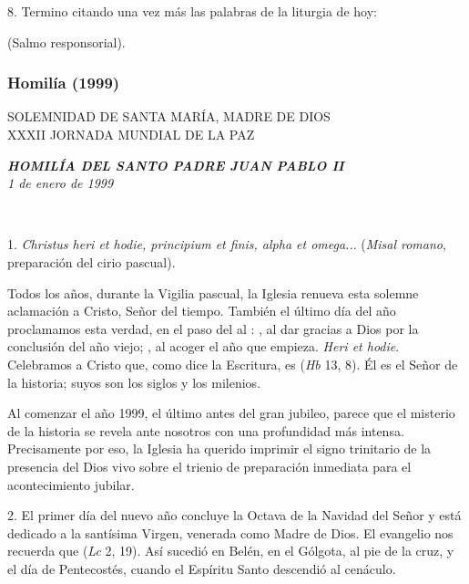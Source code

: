 8. Termino citando una vez más las palabras de la liturgia de hoy:

 (Salmo responsorial).

\subsubsection{Homilía (1999)} SOLEMNIDAD DE SANTA MARÍA, MADRE DE DIOS\\ XXXII JORNADA MUNDIAL DE LA PAZ

\emph{\textbf{HOMILÍA DEL SANTO PADRE JUAN PABLO II}}\\[2\baselineskip]\emph{1 de enero de 1999}

~

1. \emph{Christus heri et hodie, principium et finis, alpha et omega..}.  (\emph{Misal romano}, preparación del cirio pascual).

Todos los años, durante la Vigilia pascual, la Iglesia renueva esta solemne aclamación a Cristo, Señor del tiempo. También el último día del año proclamamos esta verdad, en el paso del  al : , al dar gracias a Dios por la conclusión del año viejo; , al acoger el año que empieza. \emph{Heri et hodie}. Celebramos a Cristo que, como dice la Escritura, es  (\emph{Hb} 13, 8). Él es el Señor de la historia; suyos son los siglos y los milenios.

Al comenzar el año 1999, el último antes del gran jubileo, parece que el misterio de la historia se revela ante nosotros con una profundidad más intensa. Precisamente por eso, la Iglesia ha querido imprimir el signo trinitario de la presencia del Dios vivo sobre el trienio de preparación inmediata para el acontecimiento jubilar.

2. El primer día del nuevo año concluye la Octava de la Navidad del Señor y está dedicado a la santísima Virgen, venerada como Madre de Dios. El evangelio nos recuerda que  (\emph{Lc} 2, 19). Así sucedió en Belén, en el Gólgota, al pie de la cruz, y el día de Pentecostés, cuando el Espíritu Santo descendió al cenáculo.

